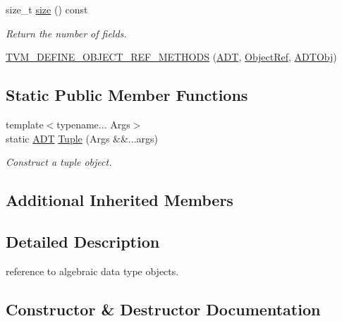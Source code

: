 \begin{DoxyCompactItemize}
size\+\_\+t \hyperlink{classtvm_1_1runtime_1_1ADT_af8cf2f61fa9b7737718f15a018d12b84}{size} () const 
\begin{DoxyCompactList}\small\item\em Return the number of fields. \end{DoxyCompactList}\item 
\hyperlink{classtvm_1_1runtime_1_1ADT_a5367ea22b4dab8c73d06031cd4c72dec}{T\+V\+M\+\_\+\+D\+E\+F\+I\+N\+E\+\_\+\+O\+B\+J\+E\+C\+T\+\_\+\+R\+E\+F\+\_\+\+M\+E\+T\+H\+O\+DS} (\hyperlink{classtvm_1_1runtime_1_1ADT}{A\+DT}, \hyperlink{classtvm_1_1runtime_1_1ObjectRef}{Object\+Ref}, \hyperlink{classtvm_1_1runtime_1_1ADTObj}{A\+D\+T\+Obj})
\end{DoxyCompactItemize}
\subsection*{Static Public Member Functions}
\begin{DoxyCompactItemize}
\item 
{\footnotesize template$<$typename... Args$>$ }\\static \hyperlink{classtvm_1_1runtime_1_1ADT}{A\+DT} \hyperlink{classtvm_1_1runtime_1_1ADT_a9952c0be3e79a57cf80a3c01fd7bbe87}{Tuple} (Args \&\&...args)
\begin{DoxyCompactList}\small\item\em Construct a tuple object. \end{DoxyCompactList}\end{DoxyCompactItemize}
\subsection*{Additional Inherited Members}


\subsection{Detailed Description}
reference to algebraic data type objects. 

\subsection{Constructor \& Destructor Documentation}
